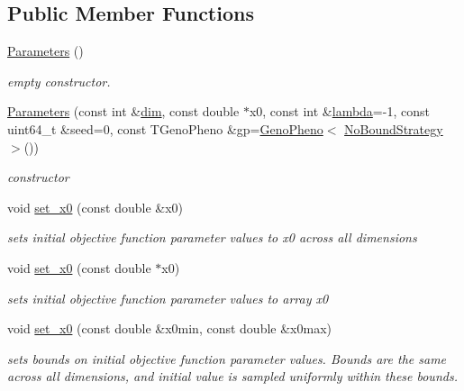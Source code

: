 \subsection*{Public Member Functions}
\begin{DoxyCompactItemize}
\item 
\hypertarget{classlibcmaes_1_1Parameters_a680f96c102aa0cb4c9e8d39b515392b9}{\hyperlink{classlibcmaes_1_1Parameters_a680f96c102aa0cb4c9e8d39b515392b9}{Parameters} ()}\label{classlibcmaes_1_1Parameters_a680f96c102aa0cb4c9e8d39b515392b9}

\begin{DoxyCompactList}\small\item\em empty constructor. \end{DoxyCompactList}\item 
\hyperlink{classlibcmaes_1_1Parameters_a082cedda8396793496e8d796bc0184b2}{Parameters} (const int \&\hyperlink{classlibcmaes_1_1Parameters_a95a3c04400a77d134bb1e9705189a24e}{dim}, const double $\ast$x0, const int \&\hyperlink{classlibcmaes_1_1Parameters_a3d569987e9a5eb61bc781ee75b2ab18a}{lambda}=-\/1, const uint64\-\_\-t \&seed=0, const T\-Geno\-Pheno \&gp=\hyperlink{classlibcmaes_1_1GenoPheno}{Geno\-Pheno}$<$ \hyperlink{classlibcmaes_1_1NoBoundStrategy}{No\-Bound\-Strategy} $>$())
\begin{DoxyCompactList}\small\item\em constructor \end{DoxyCompactList}\item 
void \hyperlink{classlibcmaes_1_1Parameters_a61660152146a78000b5cc59a0298a8f0}{set\-\_\-x0} (const double \&x0)
\begin{DoxyCompactList}\small\item\em sets initial objective function parameter values to x0 across all dimensions \end{DoxyCompactList}\item 
void \hyperlink{classlibcmaes_1_1Parameters_a50056ec90bc1b89295f8363eb566b8ce}{set\-\_\-x0} (const double $\ast$x0)
\begin{DoxyCompactList}\small\item\em sets initial objective function parameter values to array x0 \end{DoxyCompactList}\item 
void \hyperlink{classlibcmaes_1_1Parameters_a2db4deff995719566b86bfc0c2df4e91}{set\-\_\-x0} (const double \&x0min, const double \&x0max)
\begin{DoxyCompactList}\small\item\em sets bounds on initial objective function parameter values. Bounds are the same across all dimensions, and initial value is sampled uniformly within these bounds. \end{DoxyCompactList}\item 

\end{DoxyCompactItemize}
